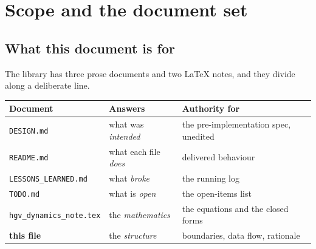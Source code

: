 \documentclass[11pt]{article}
\newcommand{\code}[1]{\texttt{#1}}
\newcommand{\pkg}[1]{\texttt{+#1}}
\begin{document}
\begin{abstract}
\medskip
\noindent\textbf{Fourth edition, 9 August 2026.} Two changes, both small, and
one of them exposes something the first three editions all missed: until
\code{dbc8e4a} \textbf{nothing in this library could write a figure to disk}.
\code{coorbital.viz.saveFigure} closes that as shared \pkg{viz} infrastructure
and \code{BM/run\_ballistic\_target} gains one user-block entry,
\code{plotFile}, on top of it (Sections~\ref{sec:viz} and~\ref{sec:entry}).
Separately, \code{globeMovie}'s caption gained the semi-transparent backdrop
the altitude inset and the legend already had, which is a design point and not
a cosmetic fix --- the same legibility rule applied to two of three overlays is
not a rule. Every count this document states as \emph{current} is re-measured
against 61 \code{.m} files and a suite that now reads \textbf{24 passed}; the
earlier editions' dated measurement tables are left as the dated records they
are, and Section~\ref{sec:verify} carries the fourth edition's own.
\end{abstract}

\tableofcontents

\section{Scope and the document set}

\subsection{What this document is for}

The library has three prose documents and two \LaTeX{} notes, and they divide
along a deliberate line.

\begin{center}
\begin{tabular}{lll}
\toprule
Document & Answers & Authority for \\
\midrule
\code{DESIGN.md}                & what was \emph{intended}     & the pre-implementation spec, unedited \\
\code{README.md}                & what each file \emph{does}   & delivered behaviour \\
\code{LESSONS\_LEARNED.md}      & what \emph{broke}            & the running log \\
\code{TODO.md}                  & what is \emph{open}          & the open-items list \\
\code{hgv\_dynamics\_note.tex}  & the \emph{mathematics}       & the equations and the closed forms \\
\textbf{this file}              & the \emph{structure}         & boundaries, data flow, rationale \\
\bottomrule
\end{tabular}
\end{center}
\end{document}

